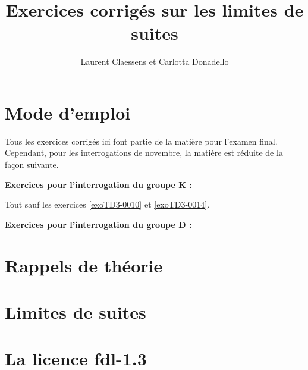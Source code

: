 



\title{Exercices corrigés sur les limites de suites}
\author{Laurent Claessens et Carlotta Donadello}



\maketitle
\section{Mode d'emploi}
Tous les exercices corrigés ici font partie de la matière pour l'examen final. Cependant, pour les interrogations de novembre, la matière est réduite de la façon suivante.

\noindent\textbf{Exercices pour l'interrogation du groupe K : }

Tout sauf les exercices \ref{exoTD3-0010} et \ref{exoTD3-0014}.

\noindent\textbf{Exercices pour l'interrogation du groupe D : }

\section{Rappels de théorie}

\section{Limites de suites}

\newpage
\section{La licence fdl-1.3}






